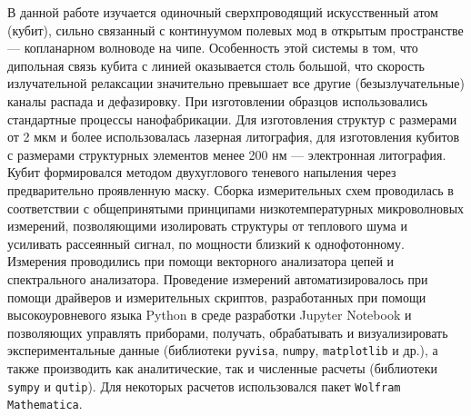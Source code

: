 {\methods} 
В данной работе изучается одиночный сверхпроводящий искусственный атом (кубит), сильно связанный с континуумом полевых мод в открытым пространстве --- копланарном волноводе на чипе. Особенность этой системы в том, что дипольная связь кубита с линией оказывается столь большой, что скорость излучательной релаксации значительно превышает все другие (безызлучательные) каналы распада и дефазировку. При изготовлении образцов использовались стандартные процессы нанофабрикации. Для изготовления структур с размерами от 2 мкм и более использовалась лазерная литография, для изготовления кубитов с размерами структурных элементов менее 200 нм --- электронная литография. Кубит формировался методом двухуглового теневого напыления через предварительно проявленную маску. Сборка измерительных схем проводилась в соответствии с общепринятыми принципами низкотемпературных микроволновых измерений, позволяющими изолировать структуры от теплового шума и усиливать рассеянный сигнал, по мощности близкий к однофотонному. Измерения проводились при помощи векторного анализатора цепей и спектрального анализатора. 
Проведение измерений автоматизировалось при помощи драйверов и измерительных скриптов, разработанных при помощи высокоуровневого языка Python в среде разработки Jupyter Notebook и позволяющих управлять приборами, получать, обрабатывать и визуализировать экспериментальные данные (библиотеки \verb|pyvisa|, \verb|numpy|, \verb|matplotlib| и др.), а также производить как аналитические, так и численные расчеты (библиотеки \verb|sympy| и \verb|qutip|). Для некоторых расчетов использовался пакет \verb|Wolfram Mathematica|.

